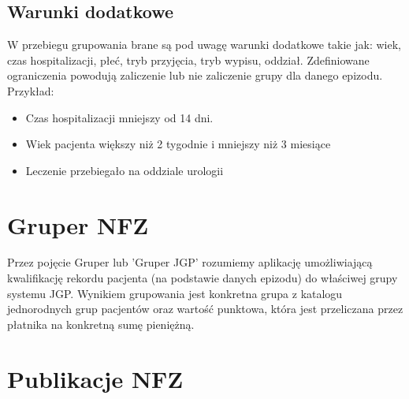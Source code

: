 
\subsection{Warunki dodatkowe}
\label{sec:warunkiDodatkowe}

W przebiegu grupowania brane są pod uwagę warunki dodatkowe takie jak: wiek, czas hospitalizacji, płeć, tryb przyjęcia, tryb wypisu, oddział. Zdefiniowane ograniczenia powodują zaliczenie lub nie zaliczenie grupy dla danego epizodu.
Przykład:
\begin{itemize}
\item Czas hospitalizacji mniejszy od 14 dni.
\item Wiek pacjenta większy niż 2 tygodnie i mniejszy niż 3 miesiące
\item Leczenie przebiegało na oddziale urologii
\end{itemize}


\section{Gruper NFZ}
\label{sec:gruperNFZ}

Przez pojęcie Gruper lub 'Gruper JGP' rozumiemy aplikację umożliwiającą kwalifikację rekordu pacjenta (na podstawie danych epizodu) do właściwej grupy systemu JGP. Wynikiem grupowania jest konkretna grupa z katalogu jednorodnych grup pacjentów oraz wartość punktowa, która jest przeliczana przez płatnika na konkretną sumę pieniężną.


\section{Publikacje NFZ}
\label{sec:publikacjeNFZ}

